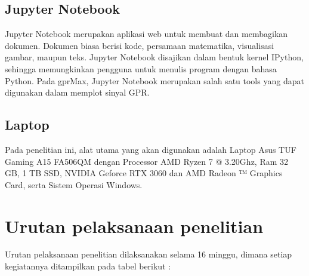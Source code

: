 \subsection{Jupyter Notebook}
\label{subsec:jupyter}

Jupyter Notebook merupakan aplikasi web untuk membuat dan membagikan dokumen. 
Dokumen biasa berisi kode, persamaan matematika, visualisasi gambar, maupun teks. 
Jupyter Notebook disajikan dalam bentuk kernel IPython, sehingga memungkinkan pengguna untuk menulis program dengan bahasa Python. 
Pada gprMax, Jupyter Notebook merupakan salah satu tools yang dapat digunakan dalam memplot sinyal GPR.

\subsection{Laptop}
\label{subsec:laptop}

Pada penelitian ini, alat utama yang akan digunakan adalah Laptop Asus TUF Gaming A15 FA506QM dengan Processor AMD Ryzen 7 @ 3.20Ghz, 
Ram 32 GB, 1 TB SSD, NVIDIA Geforce RTX 3060 dan AMD Radeon ™ Graphics Card, serta Sistem Operasi Windows.

\section{Urutan pelaksanaan penelitian}
\label{urutanPenelitian}

Urutan pelaksanaan penelitian dilaksanakan selama 16 minggu, dimana setiap kegiatannya ditampilkan pada tabel berikut :

